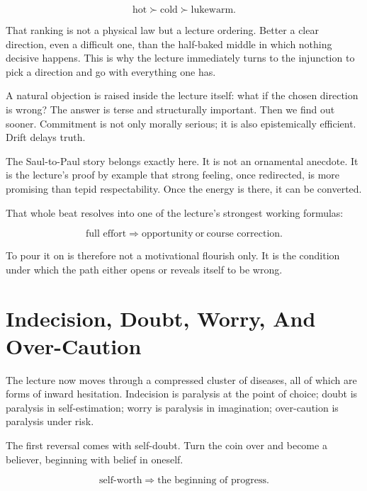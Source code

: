 \begin{equation}
\text{hot} \succ \text{cold} \succ \text{lukewarm}.
\end{equation}

That ranking is not a physical law but a lecture ordering. Better a clear direction, even a difficult one, than the half-baked middle in which nothing decisive happens. This is why the lecture immediately turns to the injunction to pick a direction and go with everything one has.

A natural objection is raised inside the lecture itself: what if the chosen direction is wrong? The answer is terse and structurally important. Then we find out sooner. Commitment is not only morally serious; it is also epistemically efficient. Drift delays truth.

The Saul-to-Paul story belongs exactly here. It is not an ornamental anecdote. It is the lecture's proof by example that strong feeling, once redirected, is more promising than tepid respectability. Once the energy is there, it can be converted.

That whole beat resolves into one of the lecture's strongest working formulas:

\begin{equation}
\text{full effort} \Rightarrow \text{opportunity} \ \text{or} \ \text{course correction}.
\end{equation}

To pour it on is therefore not a motivational flourish only. It is the condition under which the path either opens or reveals itself to be wrong.

\section{Indecision, Doubt, Worry, And Over-Caution}

The lecture now moves through a compressed cluster of diseases, all of which are forms of inward hesitation. Indecision is paralysis at the point of choice; doubt is paralysis in self-estimation; worry is paralysis in imagination; over-caution is paralysis under risk.

The first reversal comes with self-doubt. Turn the coin over and become a believer, beginning with belief in oneself.

\begin{equation}
\text{self-worth} \Rightarrow \text{the beginning of progress}.
\end{equation}

